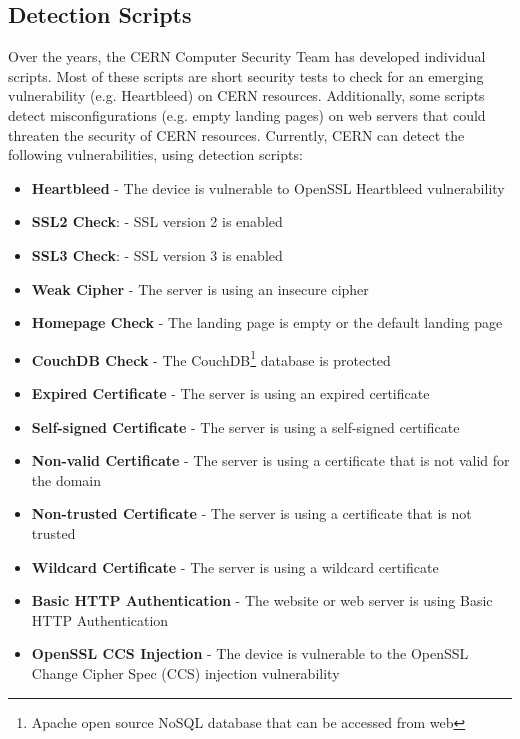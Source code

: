\subsection{Detection Scripts}
Over the years, the CERN Computer Security Team has developed individual scripts. Most of these scripts are short security tests to check for an emerging vulnerability (e.g. Heartbleed) on CERN resources. Additionally, some scripts detect misconfigurations (e.g. empty landing pages) on web servers that could threaten the security of CERN resources. Currently, CERN can detect the following vulnerabilities, using detection scripts:
\begin{itemize}
\item \textbf{Heartbleed} - The device is vulnerable to OpenSSL Heartbleed vulnerability
\item \textbf{SSL2 Check}: - SSL version 2 is enabled
\item \textbf{SSL3 Check}: - SSL version 3 is enabled
\item \textbf{Weak Cipher} - The server is using an insecure cipher
\item \textbf{Homepage Check} - The landing page is empty or the default landing page
\item \textbf{CouchDB Check} - The CouchDB\footnote{Apache open source NoSQL database that can be accessed from web} database is protected
\item \textbf{Expired Certificate} - The server is using an expired certificate
\item \textbf{Self-signed Certificate} - The server is using a self-signed certificate
\item \textbf{Non-valid Certificate} - The server is using a certificate that is not valid for the domain
\item \textbf{Non-trusted Certificate} - The server is using a certificate that is not trusted
\item \textbf{Wildcard Certificate} - The server is using a wildcard certificate
\item \textbf{Basic HTTP Authentication} - The website or web server is using Basic HTTP Authentication
\item \textbf{OpenSSL CCS Injection} - The device is vulnerable to the OpenSSL Change Cipher Spec (CCS) injection vulnerability

\end{itemize}




